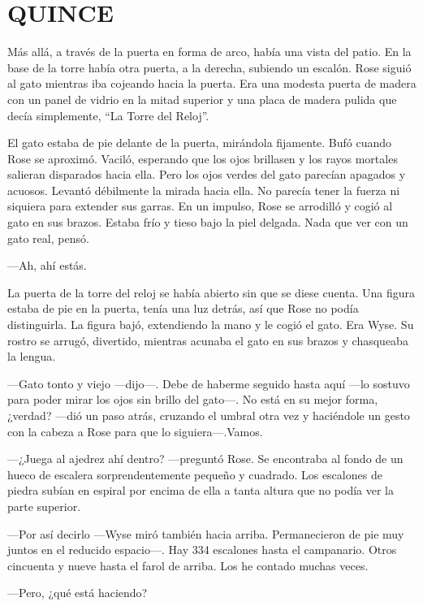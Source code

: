 \chapter*{QUINCE}

{Más allá, a través de la puerta en forma de arco, había una vista del
	patio. En la base de la torre había otra puerta, a la derecha, subiendo
	un escalón. Rose siguió al gato mientras iba cojeando hacia la puerta.
	Era una modesta puerta de madera con un panel de vidrio en la mitad
	superior y una placa de madera pulida que decía simplemente, ``La Torre
del Reloj''.}

{El gato estaba de pie delante de la puerta, mirándola fijamente. Bufó
	cuando Rose se aproximó. Vaciló, esperando que los ojos brillasen y los
	rayos mortales salieran disparados hacia ella. Pero los ojos verdes del
	gato parecían apagados y acuosos. Levantó débilmente la mirada hacia
	ella. No parecía tener la fuerza ni siquiera para extender sus garras.
	En un impulso, Rose se arrodilló y cogió al gato en sus brazos. Estaba
	frío y tieso bajo la piel delgada. Nada que ver con un gato real,
pensó.}

{---Ah, ahí estás.}

{La puerta de la torre del reloj se había abierto sin que se diese
	cuenta. Una figura estaba de pie en la puerta, tenía una luz detrás, así
	que Rose no podía distinguirla. La figura bajó, extendiendo la mano y le
	cogió el gato. Era Wyse. Su rostro se arrugó, divertido, mientras
acunaba el gato en sus brazos y chasqueaba la lengua.}

{---Gato tonto y viejo ---dijo---. Debe de haberme seguido hasta aquí
	---lo sostuvo para poder mirar los ojos sin brillo del gato---. No está
	en su mejor forma, ¿verdad? ---dió un paso atrás, cruzando el umbral
	otra vez y haciéndole un gesto con la cabeza a Rose para que lo
siguiera---.Vamos.}

{---¿Juega al ajedrez ahí dentro? ---preguntó Rose. Se encontraba al
	fondo de un hueco de escalera sorprendentemente pequeño y cuadrado. Los
	escalones de piedra subían en espiral por encima de ella a tanta altura
que no podía ver la parte superior.}

{---Por así decirlo ---Wyse miró también hacia arriba. Permanecieron de
	pie muy juntos en el reducido espacio---. Hay 334 escalones hasta el
	campanario. Otros cincuenta y nueve hasta el farol de arriba. Los he
contado muchas veces.}

{---Pero, ¿qué está haciendo?}

